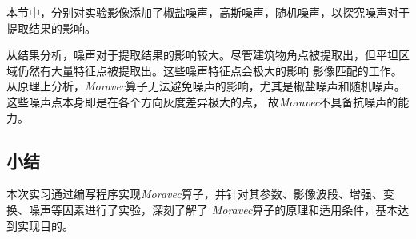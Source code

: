     本节中，分别对实验影像添加了椒盐噪声，高斯噪声，随机噪声，以探究噪声对于提取结果的影响。

    从结果分析，噪声对于提取结果的影响较大。尽管建筑物角点被提取出，但平坦区域仍然有大量特征点被提取出。这些噪声特征点会极大的影响
    影像匹配的工作。从原理上分析，\textit{Moravec}算子无法避免噪声的影响，尤其是椒盐噪声和随机噪声。这些噪声点本身即是在各个方向灰度差异极大的点，
    故\textit{Moravec}不具备抗噪声的能力。

\subsection{小结}
    本次实习通过编写程序实现\textit{Moravec}算子，并针对其参数、影像波段、增强、变换、噪声等因素进行了实验，深刻了解了
    \textit{Moravec}算子的原理和适用条件，基本达到实现目的。